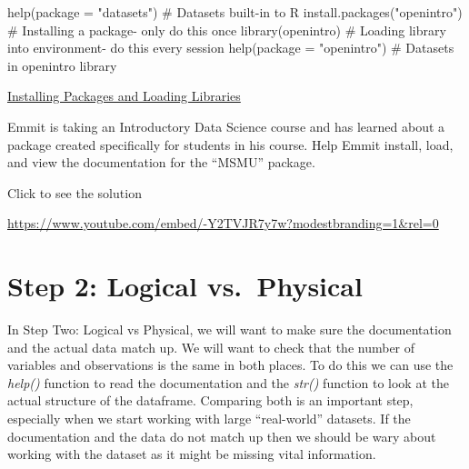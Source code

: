 \documentclass[
  letterpaper,
  DIV=11,
  numbers=noendperiod]{scrreprt}
\newenvironment{Shaded}{\begin{snugshade}}{\end{snugshade}}
\newcommand{\AttributeTok}[1]{\textcolor[rgb]{0.40,0.45,0.13}{#1}}
\newcommand{\CommentTok}[1]{\textcolor[rgb]{0.37,0.37,0.37}{#1}}
\newcommand{\FunctionTok}[1]{\textcolor[rgb]{0.28,0.35,0.67}{#1}}
\newcommand{\NormalTok}[1]{\textcolor[rgb]{0.00,0.23,0.31}{#1}}
\newcommand{\StringTok}[1]{\textcolor[rgb]{0.13,0.47,0.30}{#1}}
\begin{document}
\begin{Shaded}
\begin{Highlighting}[]
\FunctionTok{help}\NormalTok{(}\AttributeTok{package =} \StringTok{"datasets"}\NormalTok{) }\CommentTok{\# Datasets built{-}in to R}
\FunctionTok{install.packages}\NormalTok{(}\StringTok{"openintro"}\NormalTok{) }\CommentTok{\# Installing a package{-} only do this once}
\FunctionTok{library}\NormalTok{(openintro) }\CommentTok{\# Loading library into environment{-} do this every session}
\FunctionTok{help}\NormalTok{(}\AttributeTok{package =} \StringTok{"openintro"}\NormalTok{) }\CommentTok{\# Datasets in openintro library}
\end{Highlighting}
\end{Shaded}

\begin{watch}{}{}
    \href{https://youtu.be/6UPqEI9-uFE}{Installing Packages and Loading Libraries}
\end{watch}

\begin{tcolorbox}[enhanced jigsaw, leftrule=.75mm, arc=.35mm, coltitle=black, rightrule=.15mm, bottomrule=.15mm, toprule=.15mm, left=2mm, colbacktitle=quarto-callout-tip-color!10!white, title=\textcolor{quarto-callout-tip-color}{\faLightbulb}\hspace{0.5em}{Try it Out}, toptitle=1mm, breakable, colframe=quarto-callout-tip-color-frame, bottomtitle=1mm, titlerule=0mm, colback=white, opacityback=0, opacitybacktitle=0.6]

Emmit is taking an Introductory Data Science course and has learned
about a package created specifically for students in his course. Help
Emmit install, load, and view the documentation for the ``MSMU''
package.

Click to see the solution

\url{https://www.youtube.com/embed/-Y2TVJR7y7w?modestbranding=1&rel=0}

\end{tcolorbox}

\section{Step 2: Logical
vs.~Physical}\label{step-2-logical-vs.-physical}

In Step Two: Logical vs Physical, we will want to make sure the
documentation and the actual data match up. We will want to check that
the number of variables and observations is the same in both places. To
do this we can use the \emph{help()} function to read the documentation
and the \emph{str()} function to look at the actual structure of the
dataframe. Comparing both is an important step, especially when we start
working with large ``real-world'' datasets. If the documentation and the
data do not match up then we should be wary about working with the
dataset as it might be missing vital information.
\end{document}
